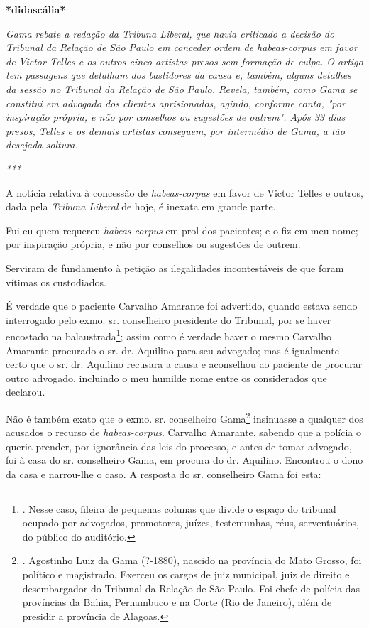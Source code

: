 \textbf{*didascália*}

\emph{Gama rebate a redação da Tribuna Liberal, que havia criticado a
decisão do Tribunal da Relação de São Paulo em conceder ordem de
habeas-corpus em favor de Victor Telles e os outros cinco artistas
presos sem formação de culpa. O artigo tem passagens que detalham dos
bastidores da causa e, também, alguns detalhes da sessão no Tribunal da
Relação de São Paulo. Revela, também, como Gama se constitui em advogado
dos clientes aprisionados, agindo, conforme conta, "por inspiração
própria, e não por conselhos ou sugestões de outrem". Após 33 dias
presos, Telles e os demais artistas conseguem, por intermédio de Gama, a
tão desejada soltura. }

\emph{***}

A notícia relativa à concessão de \emph{habeas-corpus} em favor de
Victor Telles e outros, dada pela \emph{Tribuna Liberal} de hoje, é
inexata em grande parte.

Fui eu quem requereu \emph{habeas-corpus} em prol dos pacientes; e o fiz
em meu nome; por inspiração própria, e não por conselhos ou sugestões de
outrem.

Serviram de fundamento à petição as ilegalidades incontestáveis de que
foram vítimas os custodiados.

É verdade que o paciente Carvalho Amarante foi advertido, quando estava
sendo interrogado pelo exmo. sr. conselheiro presidente do Tribunal, por
se haver encostado na balaustrada\footnote{. Nesse caso, fileira de
  pequenas colunas que divide o espaço do tribunal ocupado por
  advogados, promotores, juízes, testemunhas, réus, serventuários, do
  público do auditório.}; assim como é verdade haver o mesmo Carvalho
Amarante procurado o sr. dr. Aquilino para seu advogado; mas é
igualmente certo que o sr. dr. Aquilino recusara a causa e aconselhou ao
paciente de procurar outro advogado, incluindo o meu humilde nome entre
os considerados que declarou.

Não é também exato que o exmo. sr. conselheiro Gama\footnote{. Agostinho
  Luiz da Gama (?-1880), nascido na província do Mato Grosso, foi
  político e magistrado. Exerceu os cargos de juiz municipal, juiz de
  direito e desembargador do Tribunal da Relação de São Paulo. Foi chefe
  de polícia das províncias da Bahia, Pernambuco e na Corte (Rio de
  Janeiro), além de presidir a província de Alagoas.} insinuasse a
qualquer dos acusados o recurso de \emph{habeas-corpus}. Carvalho
Amarante, sabendo que a polícia o queria prender, por ignorância das
leis do processo, e antes de tomar advogado, foi à casa do sr.
conselheiro Gama, em procura do dr. Aquilino. Encontrou o dono da casa e
narrou-lhe o caso. A resposta do sr. conselheiro Gama foi esta:

